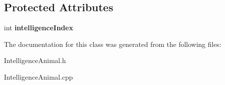 \subsection*{Protected Attributes}
\begin{DoxyCompactItemize}
\item 
\mbox{\label{class_intelligence_animal_a6e3849ba9edcfe0c616feb0abce90bd6}} 
int {\bfseries intelligence\+Index}
\end{DoxyCompactItemize}


The documentation for this class was generated from the following files\+:\begin{DoxyCompactItemize}
\item 
Intelligence\+Animal.\+h\item 
Intelligence\+Animal.\+cpp\end{DoxyCompactItemize}
